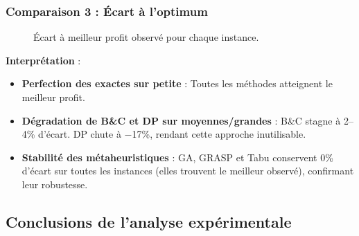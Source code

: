 \documentclass[11pt,a4paper]{article}
\begin{document}
\subsubsection*{Comparaison 3 : Écart à l'optimum}

\begin{figure}[H]
\centering
{}
\caption{Écart à meilleur profit observé pour chaque instance.}
\label{fig:gap-by-method}
\end{figure}

\textbf{Interprétation} :

\begin{itemize}
    \item \textbf{Perfection des exactes sur petite} : Toutes les méthodes atteignent le meilleur profit.
    
    \item \textbf{Dégradation de B\&C et DP sur moyennes/grandes} : B\&C stagne à 2–4\% d'écart. DP chute à −17\%, rendant cette approche inutilisable.
    
    \item \textbf{Stabilité des métaheuristiques} : GA, GRASP et Tabu conservent 0\% d'écart sur toutes les instances (elles trouvent le meilleur observé), confirmant leur robustesse.
\end{itemize}

\subsection{Conclusions de l'analyse expérimentale}
\end{document}
